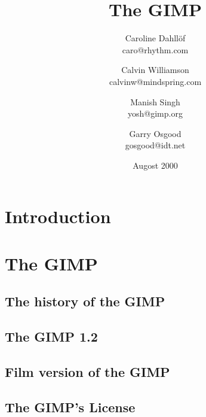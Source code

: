 \documentclass{report}
\begin{document}
\begin{titlepage}
\title{\huge The GIMP}
\author{Caroline Dahll\"{o}f\\
caro@rhythm.com 
\and Calvin Williamson\\
calvinw@mindspring.com
\and Manish Singh\\
yosh@gimp.org
\and Garry Osgood\\
gosgood@idt.net}
\date{Augost 2000}
\maketitle
\end{titlepage}
\tableofcontents


% 
%



\chapter{Introduction}


\chapter{The GIMP}

\section{The history of the GIMP} 
\section{The GIMP 1.2}

\section{Film version of the GIMP} 

\section{The GIMP's License}
\end{document}
